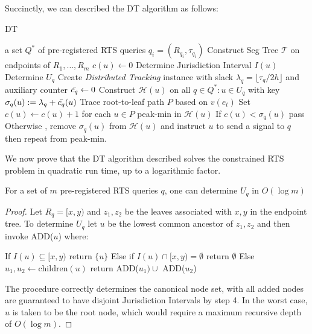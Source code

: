 Succinctly, we can described the DT algorithm as follows: 
\begin{algorithm}
\caption{DT }\label{Algorithm 2}
\begin{algorithmic}
\Require a set $Q^*$ of pre-registered RTS queries $q_i = (R_{q_i}, \tau_{q_i})$
\State Construct Seg Tree $\mathcal{T}$ on endpoints of $R_1, \dots, R_m$
    \State $c(u)\gets 0$
    \State Determine Jurisdiction Interval $I(u)$
\EndFor
{}
    \State Determine $U_q$
    \State Create \textit{Distributed Tracking} instance with slack $\lambda_q = \lfloor \tau_q/2h\rfloor$ and auxiliary counter $\Bar{c_q}\gets0$
\EndFor
{}
    \State Construct $\mathcal{H}(u)$ on all $q\in Q^* : u\in U_q$ with key $\sigma_q(u) := \lambda_q + \Bar{c_q}(u)$
\EndFor
{}
    \State Trace root-to-leaf path $P$ based on $v(e_t)$
    \State Set $c(u) \gets c(u)+1$ for each $u\in P$
        \State peak-min in $\mathcal{H}(u)$
        \State If $c(u) < \sigma_q(u)$ pass
        \State Otherwise , remove $\sigma_q(u)$ from $\mathcal{H}(u)$ and instruct $u$ to send a signal to $q$ then repeat from peak-min.
    \EndFor
\EndFor
\end{algorithmic}
\end{algorithm}
We now prove that the DT algorithm described solves the constrained RTS problem in quadratic run time, up to a logarithmic factor.

\begin{lemma}
    For a set of $m$ pre-registered RTS queries $q$, one can determine $U_q$ in $O(\log m)$ 
\end{lemma}
\begin{proof}
    Let $R_q = [x,y)$ and $z_1, z_2$ be the leaves associated with $x, y$ in the endpoint tree. To determine $U_{q}$ let $u$ be the lowest common ancestor of $z_1, z_2$ and then invoke ADD($u$) where:
    \begin{algorithm}
    \begin{algorithmic}
        \State If $I(u)\subseteq[x,y)$ return $\{u\}$
        \State Else if $I(u)\cap[x,y) = \emptyset$ return $\emptyset$
        \State Else $u_1, u_2 \gets \text{children}(u)$ return ADD($u_1) \cup $ ADD($u_2$)
    \EndProcedure
    \end{algorithmic}
    \end{algorithm}
    The procedure correctly determines the canonical node set, with all added nodes are guaranteed to have disjoint Jurisdiction Intervals by step 4. In the worst case, $u$ is taken to be the root node, which would require a maximum recursive depth of $O(\log m)$. 
\end{proof}

